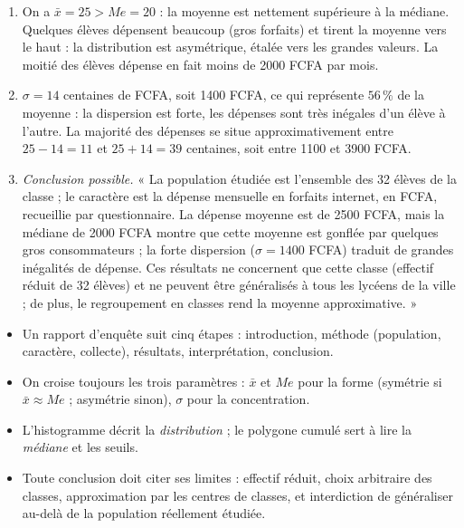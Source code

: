 \documentclass[11pt]{article}
\begin{document}
\begin{corrige}
\begin{enumerate}
\item On a $\bar{x} = 25 > Me = 20$ : la moyenne est nettement supérieure à la médiane. Quelques élèves dépensent beaucoup (gros forfaits) et tirent la moyenne vers le haut : la distribution est asymétrique, étalée vers les grandes valeurs. La moitié des élèves dépense en fait moins de \num{2000} FCFA par mois.
\item $\sigma = 14$ centaines de FCFA, soit \num{1400} FCFA, ce qui représente $56\,\%$ de la moyenne : la dispersion est forte, les dépenses sont très inégales d'un élève à l'autre. La majorité des dépenses se situe approximativement entre $25-14 = 11$ et $25+14 = 39$ centaines, soit entre \num{1100} et \num{3900} FCFA.
\item \emph{Conclusion possible.} « La population étudiée est l'ensemble des 32 élèves de la classe ; le caractère est la dépense mensuelle en forfaits internet, en FCFA, recueillie par questionnaire. La dépense moyenne est de \num{2500} FCFA, mais la médiane de \num{2000} FCFA montre que cette moyenne est gonflée par quelques gros consommateurs ; la forte dispersion ($\sigma = \num{1400}$ FCFA) traduit de grandes inégalités de dépense. Ces résultats ne concernent que cette classe (effectif réduit de 32 élèves) et ne peuvent être généralisés à tous les lycéens de la ville ; de plus, le regroupement en classes rend la moyenne approximative. »
\end{enumerate}
\end{corrige}

\begin{aretenir}
\begin{itemize}
\item Un rapport d'enquête suit cinq étapes : introduction, méthode (population, caractère, collecte), résultats, interprétation, conclusion.
\item On croise toujours les trois paramètres : $\bar{x}$ et $Me$ pour la forme (symétrie si $\bar{x} \approx Me$ ; asymétrie sinon), $\sigma$ pour la concentration.
\item L'histogramme décrit la \emph{distribution} ; le polygone cumulé sert à lire la \emph{médiane} et les seuils.
\item Toute conclusion doit citer ses limites : effectif réduit, choix arbitraire des classes, approximation par les centres de classes, et interdiction de généraliser au-delà de la population réellement étudiée.
\end{itemize}
\end{aretenir}
\end{document}
